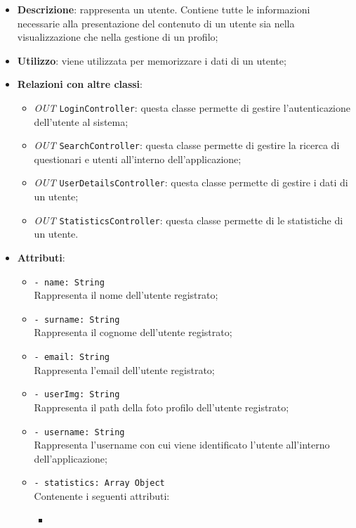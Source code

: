 		\begin{itemize}
			\item \textbf{Descrizione}: rappresenta un utente. Contiene tutte le informazioni necessarie alla presentazione del contenuto di un utente sia nella visualizzazione che nella gestione di un profilo;
			\item \textbf{Utilizzo}: viene utilizzata per memorizzare i dati di un utente;
			\item \textbf{Relazioni con altre classi}: 
			\begin{itemize}
				\item \textit{OUT} \texttt{LoginController}: questa classe permette di gestire l'autenticazione dell'utente al sistema;
				\item \textit{OUT} \texttt{SearchController}: questa classe permette di gestire la ricerca di questionari e utenti all'interno dell'applicazione;
				\item \textit{OUT} \texttt{UserDetailsController}: questa classe permette di gestire i dati di un utente;
				\item \textit{OUT} \texttt{StatisticsController}: questa classe permette di le statistiche di un utente.
			\end{itemize}
			\item \textbf{Attributi}: 
			\begin{itemize}
				\item 
				\texttt{- name: String}\\
				Rappresenta il nome  dell'utente registrato;
				\item 
				\texttt{- surname: String}\\
				Rappresenta il cognome  dell'utente registrato;
				\item 
				\texttt{- email: String}\\
				Rappresenta l'email  dell'utente registrato;
				\item 
				\texttt{- userImg: String}\\
				Rappresenta il path della foto profilo dell'utente registrato;
				\item 
				\texttt{- username: String}\\ 
				Rappresenta l'username con cui viene identificato l'utente all'interno dell'applicazione;		  		
				\item
				\texttt{- statistics: Array Object}\\
				Contenente i seguenti attributi:
				\begin{itemize}
					\item

\end{itemize}
\end{itemize}
\end{itemize}
